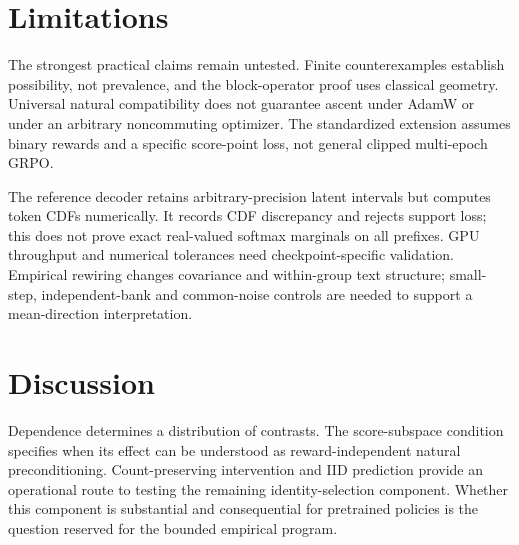 \section{Limitations}
The strongest practical claims remain untested. Finite counterexamples establish
possibility, not prevalence, and the block-operator proof uses classical geometry.
Universal natural compatibility does not guarantee ascent under AdamW or under an
arbitrary noncommuting optimizer. The standardized extension assumes binary rewards
and a specific score-point loss, not general clipped multi-epoch GRPO.

The reference decoder retains arbitrary-precision latent intervals but computes
token CDFs numerically. It records CDF discrepancy and rejects support loss; this
does not prove exact real-valued softmax marginals on all prefixes. GPU throughput
and numerical tolerances need checkpoint-specific validation. Empirical rewiring
changes covariance and within-group text structure; small-step, independent-bank
and common-noise controls are needed to support a mean-direction interpretation.

\section{Discussion}
Dependence determines a distribution of contrasts. The score-subspace condition
specifies when its effect can be understood as reward-independent natural
preconditioning. Count-preserving intervention and IID prediction provide an
operational route to testing the remaining identity-selection component. Whether
this component is substantial and consequential for pretrained policies is the
question reserved for the bounded empirical program.
